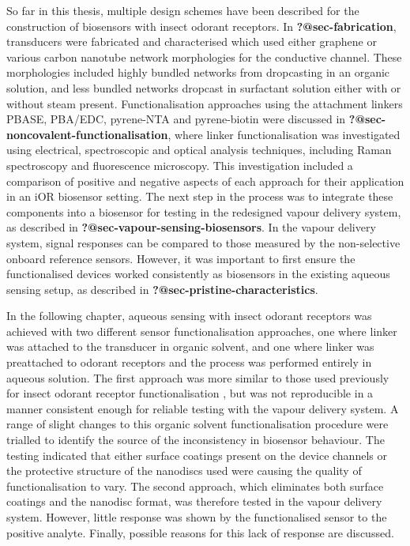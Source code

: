 \documentclass[
  a4paper,
]{scrbook}
\begin{document}
So far in this thesis, multiple design schemes have been described for
the construction of biosensors with insect odorant receptors. In
\textbf{?@sec-fabrication}, transducers were fabricated and
characterised which used either graphene or various carbon nanotube
network morphologies for the conductive channel. These morphologies
included highly bundled networks from dropcasting in an organic
solution, and less bundled networks dropcast in surfactant solution
either with or without steam present. Functionalisation approaches using
the attachment linkers PBASE, PBA/EDC, pyrene-NTA and pyrene-biotin were
discussed in \textbf{?@sec-noncovalent-functionalisation}, where linker
functionalisation was investigated using electrical, spectroscopic and
optical analysis techniques, including Raman spectroscopy and
fluorescence microscopy. This investigation included a comparison of
positive and negative aspects of each approach for their application in
an iOR biosensor setting. The next step in the process was to integrate
these components into a biosensor for testing in the redesigned vapour
delivery system, as described in
\textbf{?@sec-vapour-sensing-biosensors}. In the vapour delivery system,
signal responses can be compared to those measured by the non-selective
onboard reference sensors. However, it was important to first ensure the
functionalised devices worked consistently as biosensors in the existing
aqueous sensing setup, as described in
\textbf{?@sec-pristine-characteristics}.

In the following chapter, aqueous sensing with insect odorant receptors
was achieved with two different sensor functionalisation approaches, one
where linker was attached to the transducer in organic solvent, and one
where linker was preattached to odorant receptors and the process was
performed entirely in aqueous solution. The first approach was more
similar to those used previously for insect odorant receptor
functionalisation \autocite{Murugathas2019b,Murugathas2020}, but was not
reproducible in a manner consistent enough for reliable testing with the
vapour delivery system. A range of slight changes to this organic
solvent functionalisation procedure were trialled to identify the source
of the inconsistency in biosensor behaviour. The testing indicated that
either surface coatings present on the device channels or the protective
structure of the nanodiscs used were causing the quality of
functionalisation to vary. The second approach, which eliminates both
surface coatings and the nanodisc format, was therefore tested in the
vapour delivery system. However, little response was shown by the
functionalised sensor to the positive analyte. Finally, possible reasons
for this lack of response are discussed.
\end{document}
